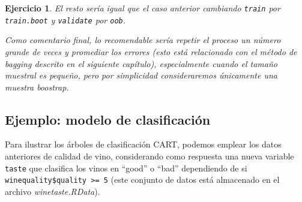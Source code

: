 \documentclass[
]{book}
\newenvironment{Shaded}{\begin{snugshade}}{\end{snugshade}}
\newcommand{\AttributeTok}[1]{\textcolor[rgb]{0.77,0.63,0.00}{#1}}
\newcommand{\CommentTok}[1]{\textcolor[rgb]{0.56,0.35,0.01}{\textit{#1}}}
\newcommand{\DecValTok}[1]{\textcolor[rgb]{0.00,0.00,0.81}{#1}}
\newcommand{\FunctionTok}[1]{\textcolor[rgb]{0.00,0.00,0.00}{#1}}
\newcommand{\NormalTok}[1]{#1}
\newcommand{\OtherTok}[1]{\textcolor[rgb]{0.56,0.35,0.01}{#1}}
\newcommand{\SpecialCharTok}[1]{\textcolor[rgb]{0.00,0.00,0.00}{#1}}
\newcommand{\StringTok}[1]{\textcolor[rgb]{0.31,0.60,0.02}{#1}}
\theoremstyle{break}
\newtheorem{exercise}{Ejercicio}[chapter]
\theoremstyle{nonumberplain}
\renewcommand{\CommentTok}[1]{\textcolor[rgb]{0.41,0.41,0.41}{\texttt{#1}}}
\begin{document}
\begin{exercise}
El resto sería igual que el caso anterior cambiando \texttt{train} por \texttt{train.boot} y \texttt{validate} por \texttt{oob}.

Como comentario final, lo recomendable sería repetir el proceso un número grande de veces y promediar los errores (esto está relacionado con el método de \emph{bagging} descrito en el siguiente capítulo), especialmente cuando el tamaño muestral es pequeño, pero por simplicidad consideraremos únicamente una muestra boostrap.
\end{exercise}

\hypertarget{class-rpart}{%
\subsection{Ejemplo: modelo de clasificación}\label{class-rpart}}

Para ilustrar los árboles de clasificación CART, podemos emplear los datos anteriores de calidad de vino, considerando como respuesta una nueva variable \texttt{taste} que clasifica los vinos en ``good'' o ``bad'' dependiendo de si \texttt{winequality\$quality\ \textgreater{}=\ 5} (este conjunto de datos está almacenado en el archivo \emph{winetaste.RData}).

\begin{Shaded}
\end{Shaded}
\end{document}
